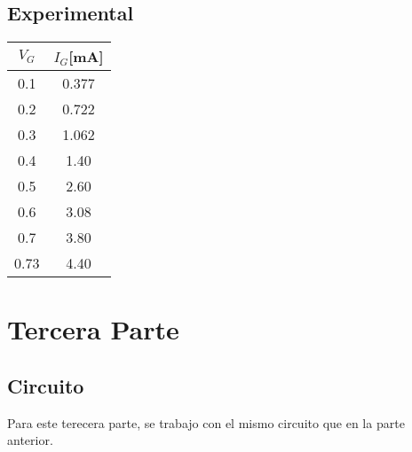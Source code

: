   \subsection{Experimental} %
\begin{minipage}{0.3\linewidth}
\centering
  \begin{table}[H]
    \begin{center}
      \begin{tabular}{c|c}
        $V_{G}$ &$I_{G}$[mA]   \\
        \hline
        0.1   &0.377 \\
        0.2   &0.722 \\
        0.3   &1.062 \\
        0.4   &1.40  \\
        0.5   &2.60  \\
        0.6   &3.08  \\
        0.7   &3.80  \\
        0.73  &4.40  \\
      \end{tabular}
    \end{center} 
  \end{table}
\end{minipage}
\begin{minipage}{0.7\linewidth}
\centering
{}
\end{minipage}
\section{Tercera Parte}
\subsection{Circuito}
Para este terecera parte, se trabajo con el mismo circuito que en la parte anterior.
